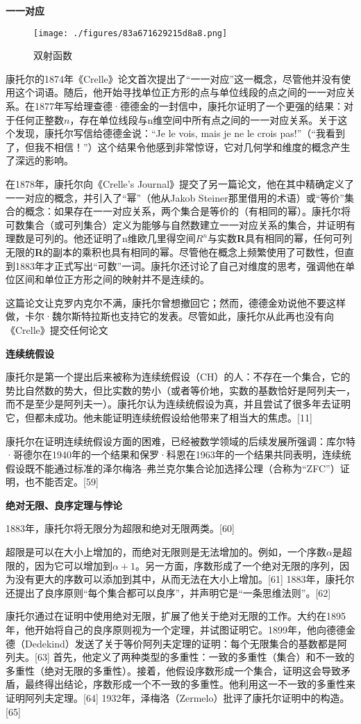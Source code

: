 \textbf{一一对应}

\begin{figure}[ht]
\centering
\texttt{[image: ./figures/83a671629215d8a8.png]}
\caption{双射函数} \label{fig_Canto_5}
\end{figure}
康托尔的1874年《Crelle》论文首次提出了“一一对应”这一概念，尽管他并没有使用这个词语。随后，他开始寻找单位正方形的点与单位线段的点之间的一一对应关系。在1877年写给理查德·德德金的一封信中，康托尔证明了一个更强的结果：对于任何正整数\(n\)，存在单位线段与n维空间中所有点之间的一一对应关系。关于这个发现，康托尔写信给德德金说：“Je le vois, mais je ne le crois pas!”（“我看到了，但我不相信！”）这个结果令他感到非常惊讶，它对几何学和维度的概念产生了深远的影响。

在1878年，康托尔向《Crelle's Journal》提交了另一篇论文，他在其中精确定义了一一对应的概念，并引入了“幂”（他从Jakob Steiner那里借用的术语）或“等价”集合的概念：如果存在一一对应关系，两个集合是等价的（有相同的幂）。康托尔将可数集合（或可列集合）定义为能够与自然数建立一一对应关系的集合，并证明有理数是可列的。他还证明了n维欧几里得空间\(R^n\)与实数\textbf{R}具有相同的幂，任何可列无限的\textbf{R}的副本的乘积也具有相同的幂。尽管他在概念上频繁使用了可数性，但直到1883年才正式写出“可数”一词。康托尔还讨论了自己对维度的思考，强调他在单位区间和单位正方形之间的映射并不是连续的。

这篇论文让克罗内克尔不满，康托尔曾想撤回它；然而，德德金劝说他不要这样做，卡尔·魏尔斯特拉斯也支持它的发表。尽管如此，康托尔从此再也没有向《Crelle》提交任何论文

\textbf{连续统假设}

康托尔是第一个提出后来被称为连续统假设（CH）的人：不存在一个集合，它的势比自然数的势大，但比实数的势小（或者等价地，实数的基数恰好是阿列夫一，而不是至少是阿列夫一）。康托尔认为连续统假设为真，并且尝试了很多年去证明它，但都未成功。他未能证明连续统假设给他带来了相当大的焦虑。[11]

康托尔在证明连续统假设方面的困难，已经被数学领域的后续发展所强调：库尔特·哥德尔在1940年的一个结果和保罗·科恩在1963年的一个结果共同表明，连续统假设既不能通过标准的泽尔梅洛–弗兰克尔集合论加选择公理（合称为“ZFC”）证明，也不能否定。[59]

\textbf{绝对无限、良序定理与悖论}

1883年，康托尔将无限分为超限和绝对无限两类。[60]

超限是可以在大小上增加的，而绝对无限则是无法增加的。例如，一个序数\(\alpha\)是超限的，因为它可以增加到\(\alpha+1\)。另一方面，序数形成了一个绝对无限的序列，因为没有更大的序数可以添加到其中，从而无法在大小上增加。[61] 1883年，康托尔还提出了良序原则“每个集合都可以良序”，并声明它是“一条思维法则”。[62]

康托尔通过在证明中使用绝对无限，扩展了他关于绝对无限的工作。大约在1895年，他开始将自己的良序原则视为一个定理，并试图证明它。1899年，他向德德金德（Dedekind）发送了关于等价阿列夫定理的证明：每个无限集合的基数都是阿列夫。[63] 首先，他定义了两种类型的多重性：一致的多重性（集合）和不一致的多重性（绝对无限的多重性）。接着，他假设序数形成一个集合，证明这会导致矛盾，最终得出结论，序数形成一个不一致的多重性。他利用这一不一致的多重性来证明阿列夫定理。[64] 1932年，泽梅洛（Zermelo）批评了康托尔证明中的构造。[65]

